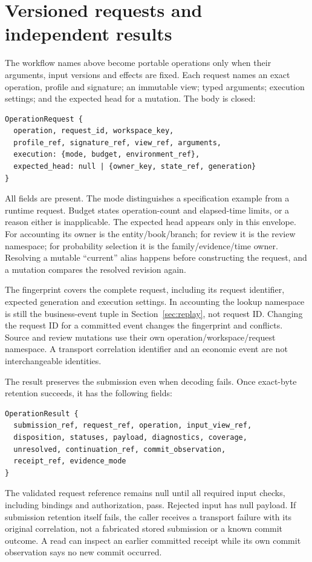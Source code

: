 \section{Versioned requests and independent results}
\label{sec:versioned-operations}

The workflow names above become portable operations only when their arguments,
input versions and effects are fixed. Each request names an exact operation,
profile and signature; an immutable view; typed arguments; execution settings;
and the expected head for a mutation. The body is closed:
\begin{lstlisting}
OperationRequest {
  operation, request_id, workspace_key,
  profile_ref, signature_ref, view_ref, arguments,
  execution: {mode, budget, environment_ref},
  expected_head: null | {owner_key, state_ref, generation}
}
\end{lstlisting}
All fields are present. The mode distinguishes a specification example from a
runtime request. Budget states operation-count and elapsed-time limits, or a
reason either is inapplicable. The expected head appears only in this envelope.
For accounting its owner is the entity/book/branch; for review it is the review
namespace; for probability selection it is the family/evidence/time owner.
Resolving a mutable ``current'' alias happens before constructing the request,
and a mutation compares the resolved revision again.

The fingerprint covers the complete request, including its request identifier,
expected generation and execution settings. In accounting the lookup namespace
is still the business-event tuple in Section~\ref{sec:replay}, not request ID.
Changing the request ID for a committed event changes the fingerprint and
conflicts. Source and review mutations use their own operation/workspace/request
namespace. A transport correlation identifier and an economic event are not
interchangeable identities.

The result preserves the submission even when decoding fails. Once exact-byte
retention succeeds, it has the following fields:
\begin{lstlisting}
OperationResult {
  submission_ref, request_ref, operation, input_view_ref,
  disposition, statuses, payload, diagnostics, coverage,
  unresolved, continuation_ref, commit_observation,
  receipt_ref, evidence_mode
}
\end{lstlisting}
The validated request reference remains null until all required input checks,
including bindings and authorization, pass. Rejected input has null payload.
If submission retention itself fails, the caller receives a transport failure
with its original correlation, not a fabricated stored submission or a known
commit outcome. A read can inspect an earlier committed receipt while its own
commit observation says no new commit occurred.


